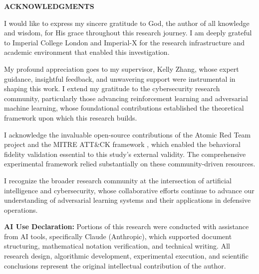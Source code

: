 \documentclass[12pt,oneside]{article}
\begin{document}
\clearpage
\begin{center}
\large\textbf{ACKNOWLEDGMENTS}
\end{center}

\vspace{1em}

I would like to express my sincere gratitude to God, the author of all knowledge and wisdom, for His grace throughout this research journey. I am deeply grateful to Imperial College London and Imperial-X for the research infrastructure and academic environment that enabled this investigation.

My profound appreciation goes to my supervisor, Kelly Zhang, whose expert guidance, insightful feedback, and unwavering support were instrumental in shaping this work. I extend my gratitude to the cybersecurity research community, particularly those advancing reinforcement learning and adversarial machine learning, whose foundational contributions established the theoretical framework upon which this research builds.

I acknowledge the invaluable open-source contributions of the Atomic Red Team project \cite{atomic_red_team} and the MITRE ATT\&CK framework \cite{mitre_attack_2023}, which enabled the behavioral fidelity validation essential to this study's external validity. The comprehensive experimental framework relied substantially on these community-driven resources.

I recognize the broader research community at the intersection of artificial intelligence and cybersecurity, whose collaborative efforts continue to advance our understanding of adversarial learning systems and their applications in defensive operations.

\vspace{0.5em}
\noindent\textbf{AI Use Declaration:} Portions of this research were conducted with assistance from AI tools, specifically Claude (Anthropic), which supported document structuring, mathematical notation verification, and technical writing. All research design, algorithmic development, experimental execution, and scientific conclusions represent the original intellectual contribution of the author.


\clearpage

\listoffigures
\clearpage

\listoftables
\clearpage

\setcounter{page}{1}
\pagestyle{fancy}
\fancyhf{}
\fancyfoot[C]{\thepage}
\clearpage
\end{document}
